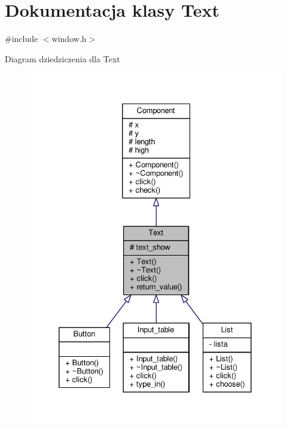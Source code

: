 \hypertarget{classText}{}\section{Dokumentacja klasy Text}
\label{classText}


{\ttfamily \#include $<$window.\+h$>$}



Diagram dziedziczenia dla Text
\nopagebreak
\begin{figure}[H]
\begin{center}
\leavevmode
\includegraphics[width=332pt]{classText__inherit__graph}
\end{center}
\end{figure}


